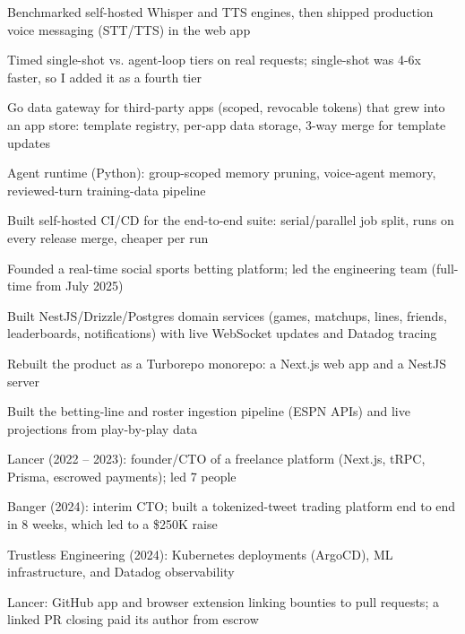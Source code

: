 \documentclass[print]{jack-resume}
\begin{document}
\begin{tightemize}
    \item Benchmarked self-hosted Whisper and TTS engines, then shipped production voice messaging (STT/TTS) in the web app
    \item Timed single-shot vs. agent-loop tiers on real requests; single-shot was 4-6x faster, so I added it as a fourth tier
    \item Go data gateway for third-party apps (scoped, revocable tokens) that grew into an app store: template registry, per-app data storage, 3-way merge for template updates
    \item Agent runtime (Python): group-scoped memory pruning, voice-agent memory, reviewed-turn training-data pipeline
    \item Built self-hosted CI/CD for the end-to-end suite: serial/parallel job split, runs on every release merge, cheaper per run
\end{tightemize}
\sectionsep

\begin{tightemize}
    \item Founded a real-time social sports betting platform; led the engineering team (full-time from July 2025)
    \item Built NestJS/Drizzle/Postgres domain services (games, matchups, lines, friends, leaderboards, notifications) with live WebSocket updates and Datadog tracing
    \item Rebuilt the product as a Turborepo monorepo: a Next.js web app and a NestJS server
    \item Built the betting-line and roster ingestion pipeline (ESPN APIs) and live projections from play-by-play data
\end{tightemize}
\sectionsep

\begin{tightemize}
    \item Lancer (2022 -- 2023): founder/CTO of a freelance platform (Next.js, tRPC, Prisma, escrowed payments); led 7 people
    \item Banger (2024): interim CTO; built a tokenized-tweet trading platform end to end in 8 weeks, which led to a \$250K raise
    \item Trustless Engineering (2024): Kubernetes deployments (ArgoCD), ML infrastructure, and Datadog observability
    \item Lancer: GitHub app and browser extension linking bounties to pull requests; a linked PR closing paid its author from escrow
\end{tightemize}
\sectionsep
\end{document}

